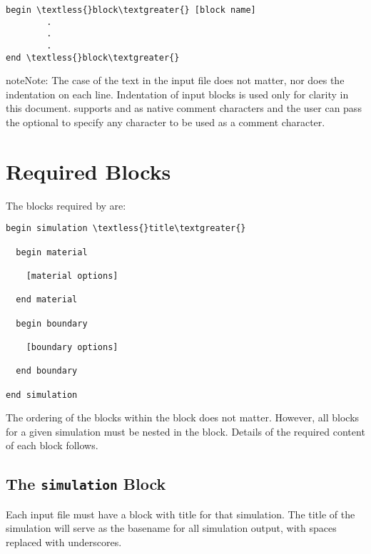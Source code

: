 \documentclass[letterpaper,10pt,english]{sphinxmanual}
\begin{document}
\begin{Verbatim}[commandchars=\\\{\}]
begin \textless{}block\textgreater{} [block name]
        .
        .
        .
end \textless{}block\textgreater{}
\end{Verbatim}

\begin{notice}{note}{Note:}
The case of the text in the input file does not matter, nor does the
indentation on each line. Indentation of input blocks is used only for clarity
in this document.  supports \code{\#} and \code{\$} as native
comment characters and the user can pass the optional  to
specify any character  to be used as a comment character.
\end{notice}


\section{Required Blocks}
\label{Files/input_file_formatting:required-blocks}\label{Files/input_file_formatting:id2}
The blocks required by  are:

\begin{Verbatim}[commandchars=\\\{\}]
begin simulation \textless{}title\textgreater{}

  begin material

    [material options]

  end material

  begin boundary

    [boundary options]

  end boundary

end simulation
\end{Verbatim}

The ordering of the blocks within the  block does not matter.
However, all blocks for a given simulation must be nested in the 
block. Details of the required content of each block follows.


\subsection{The \texttt{simulation} Block}
\label{Files/input_file_formatting:simulation-block}\label{Files/input_file_formatting:the-simulation-block}
Each input file must have a  block with title for that simulation. The
title of the simulation will serve as the basename for all simulation output,
with spaces replaced with underscores.
\end{document}
